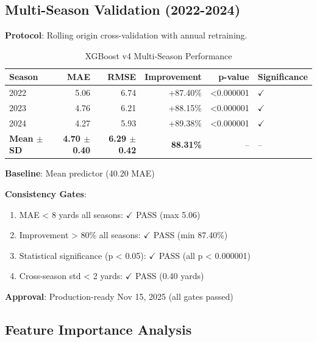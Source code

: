 \subsection{Multi-Season Validation (2022-2024)}

\textbf{Protocol}: Rolling origin cross-validation with annual retraining.

\begin{table}[h]
\centering
\caption{XGBoost v4 Multi-Season Performance}
\label{tab:xgboost-v4-multisea son}
\begin{tabular}{lrrrrl}
\toprule
\textbf{Season} & \textbf{MAE} & \textbf{RMSE} & \textbf{Improvement} & \textbf{p-value} & \textbf{Significance} \\
\midrule
2022 & 5.06 & 6.74 & +87.40\% & <0.000001 & $\checkmark$ \\
2023 & 4.76 & 6.21 & +88.15\% & <0.000001 & $\checkmark$ \\
2024 & 4.27 & 5.93 & +89.38\% & <0.000001 & $\checkmark$ \\
\midrule
\textbf{Mean $\pm$ SD} & \textbf{4.70 $\pm$ 0.40} & \textbf{6.29 $\pm$ 0.42} & \textbf{88.31\%} & -- & -- \\
\bottomrule
\end{tabular}
\end{table}

\textbf{Baseline}: Mean predictor (40.20 MAE)

\textbf{Consistency Gates}:
\begin{enumerate}
\item MAE < 8 yards all seasons: $\checkmark$ PASS (max 5.06)
\item Improvement > 80\% all seasons: $\checkmark$ PASS (min 87.40\%)
\item Statistical significance (p < 0.05): $\checkmark$ PASS (all p < 0.000001)
\item Cross-season std < 2 yards: $\checkmark$ PASS (0.40 yards)
\end{enumerate}

\textbf{Approval}: Production-ready Nov 15, 2025 (all gates passed)

\subsection{Feature Importance Analysis}

